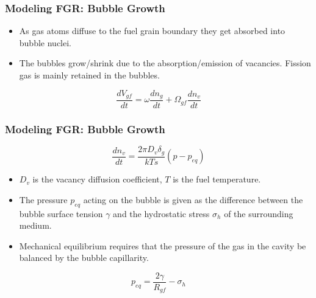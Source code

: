 \begin{frame}
\frametitle{Modeling FGR: Bubble Growth}

\begin{itemize}
  \item As gas atoms diffuse to the fuel grain boundary they get absorbed into bubble nuclei. 
  \item The bubbles grow/shrink due to the absorption/emission of vacancies. Fission gas is mainly retained in the bubbles.   
\end{itemize}

\begin{equation}
 \frac{dV_{gf}}{dt} = \omega\frac{dn_g}{dt} + \Omega_{gf}\frac{dn_v}{dt}  \nonumber
\end{equation}  

\end{frame}
\begin{frame}
\frametitle{Modeling FGR: Bubble Growth}

\begin{equation}
 \frac{dn_v}{dt} = \frac{2\pi D_v \delta_g}{kTs}\left(p - p_{eq}\right) \nonumber
\end{equation}   

\begin{itemize}  
  \item $D_v$ is the vacancy diffusion coefficient, $T$ is the fuel temperature.
  \item The pressure $p_{eq}$ acting on the bubble is given as the difference between the bubble surface tension $\gamma$ and the hydrostatic stress $\sigma_h$ of the surrounding medium.
  \item Mechanical equilibrium requires that the pressure of the gas in the cavity be balanced by the bubble capillarity.
\end{itemize}

\begin{equation}
 p_{eq} = \frac{2\gamma}{R_{gf}} - \sigma_h \nonumber
\end{equation} 

\end{frame}
